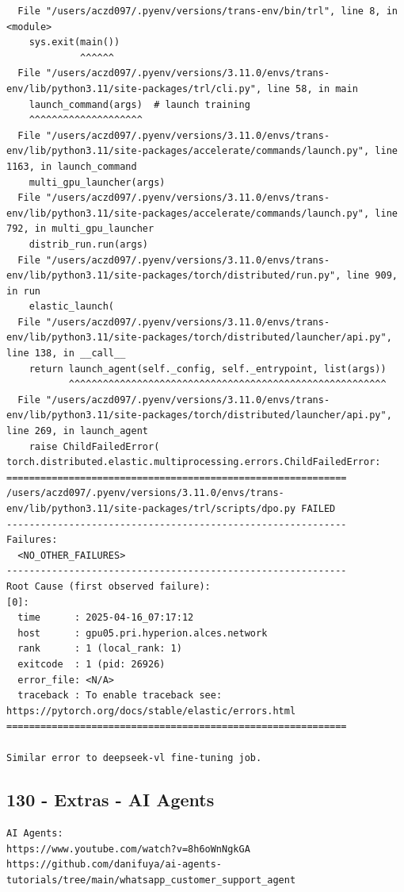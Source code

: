 \begin{verbatim}
  File "/users/aczd097/.pyenv/versions/trans-env/bin/trl", line 8, in <module>
    sys.exit(main())
             ^^^^^^
  File "/users/aczd097/.pyenv/versions/3.11.0/envs/trans-env/lib/python3.11/site-packages/trl/cli.py", line 58, in main
    launch_command(args)  # launch training
    ^^^^^^^^^^^^^^^^^^^^
  File "/users/aczd097/.pyenv/versions/3.11.0/envs/trans-env/lib/python3.11/site-packages/accelerate/commands/launch.py", line 1163, in launch_command
    multi_gpu_launcher(args)
  File "/users/aczd097/.pyenv/versions/3.11.0/envs/trans-env/lib/python3.11/site-packages/accelerate/commands/launch.py", line 792, in multi_gpu_launcher
    distrib_run.run(args)
  File "/users/aczd097/.pyenv/versions/3.11.0/envs/trans-env/lib/python3.11/site-packages/torch/distributed/run.py", line 909, in run
    elastic_launch(
  File "/users/aczd097/.pyenv/versions/3.11.0/envs/trans-env/lib/python3.11/site-packages/torch/distributed/launcher/api.py", line 138, in __call__
    return launch_agent(self._config, self._entrypoint, list(args))
           ^^^^^^^^^^^^^^^^^^^^^^^^^^^^^^^^^^^^^^^^^^^^^^^^^^^^^^^^
  File "/users/aczd097/.pyenv/versions/3.11.0/envs/trans-env/lib/python3.11/site-packages/torch/distributed/launcher/api.py", line 269, in launch_agent
    raise ChildFailedError(
torch.distributed.elastic.multiprocessing.errors.ChildFailedError: 
============================================================
/users/aczd097/.pyenv/versions/3.11.0/envs/trans-env/lib/python3.11/site-packages/trl/scripts/dpo.py FAILED
------------------------------------------------------------
Failures:
  <NO_OTHER_FAILURES>
------------------------------------------------------------
Root Cause (first observed failure):
[0]:
  time      : 2025-04-16_07:17:12
  host      : gpu05.pri.hyperion.alces.network
  rank      : 1 (local_rank: 1)
  exitcode  : 1 (pid: 26926)
  error_file: <N/A>
  traceback : To enable traceback see: https://pytorch.org/docs/stable/elastic/errors.html
============================================================

Similar error to deepseek-vl fine-tuning job.

\end{verbatim}

\subsection{130 - Extras - AI Agents}
\label{app_res:130}

\begin{verbatim}
AI Agents:
https://www.youtube.com/watch?v=8h6oWnNgkGA
https://github.com/danifuya/ai-agents-tutorials/tree/main/whatsapp_customer_support_agent

\end{verbatim}

